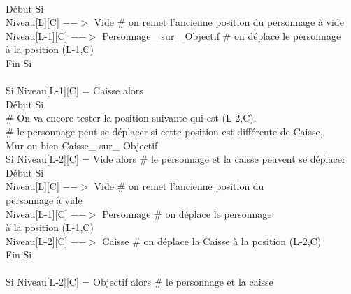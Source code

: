 \documentclass{article}
\begin{document}
\begin{tabbing}
\\	\hspace{3cm}	Début Si
\\	\hspace{4cm}		Niveau[L][C] $-->$ Vide 				\# on remet l'ancienne position du personnage à vide
\\	\hspace{4cm}		Niveau[L-1][C] $-->$ Personnage\_ sur\_ Objectif	\# on déplace le personnage
\\ \hspace{4cm} à la position (L-1,C)
\\	\hspace{3cm}	Fin Si 
\\		
\\	\hspace{3cm}	Si Niveau[L-1][C] = Caisse alors			
\\	\hspace{3cm}	Début Si
\\	\hspace{4cm}		\# On va encore tester la position suivante qui est (L-2,C). 
\\	\hspace{4cm}		\# le personnage peut se déplacer si cette position est différente de Caisse,
\\ \hspace{4cm} Mur ou bien Caisse\_ sur\_ Objectif
\\	\hspace{4cm}		Si Niveau[L-2][C] = Vide alors          \# le personnage et la caisse peuvent se déplacer
\\	\hspace{4cm}		Début Si
\\	\hspace{5cm}			Niveau[L][C] $-->$ Vide 		\# on remet l'ancienne position du
\\ \hspace{5cm} personnage à vide
\\	\hspace{5cm}			Niveau[L-1][C] $-->$ Personnage	\# on déplace le personnage
\\ \hspace{5cm} à la position (L-1,C)
\\	\hspace{5cm}			Niveau[L-2][C] $-->$ Caisse	\# on déplace la Caisse à la position (L-2,C)
\\	\hspace{4cm}		Fin Si
\\
\\	\hspace{4cm}		Si Niveau[L-2][C] = Objectif alors         	\# le personnage et la caisse

\end{tabbing}
\end{document}
